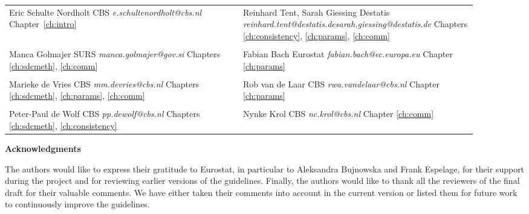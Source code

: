 \documentclass[openany,oneside]{book}
\begin{document}
\noindent
\begin{tabular}{p{0.45\linewidth}p{0.45\linewidth}}
Eric Schulte Nordholt\newline
CBS\newline
\textit{e.schultenordholt@cbs.nl}\newline
Chapter~\ref{ch:intro}
&
Reinhard Tent, Sarah Giessing\newline
Destatis\newline
\textit{reinhard.tent@destatis.de}\newline \textit{sarah.giessing@destatis.de}\newline
Chapters \ref{ch:consistency}, \ref{ch:params}, \ref{ch:comm}
\\
&\\
Manca Golmajer\newline
SURS\newline
\textit{manca.golmajer@gov.si}\newline
Chapters \ref{ch:sdcmeth}, \ref{ch:comm}
&
Fabian Bach\newline
Eurostat\newline
\textit{fabian.bach@ec.europa.eu}
\newline
Chapter \ref{ch:params}
\\
&\\
Marieke de Vries\newline
CBS\newline
\textit{mm.devries@cbs.nl}\newline
Chapters \ref{ch:sdcmeth}, \ref{ch:params}, \ref{ch:comm}
&
Rob van de Laar\newline
CBS\newline
\textit{rwa.vandelaar@cbs.nl}\newline
Chapter \ref{ch:params}
\\
&\\
Peter-Paul de Wolf\newline
CBS\newline
\textit{pp.dewolf@cbs.nl}\newline
Chapters \ref{ch:sdcmeth}, \ref{ch:consistency}
&
Nynke Krol\newline
CBS\newline
\textit{nc.krol@cbs.nl}\newline
Chapter \ref{ch:comm}
\end{tabular}\bigskip\bigskip

\noindent \textbf{\large Acknowledgments}\bigskip

\noindent 
The authors would like to express their gratitude to Eurostat, in particular to Aleksandra Bujnowska and Frank Espelage, for their support during the project and for reviewing earlier versions of the guidelines. 
Finally, the authors would like to thank all the reviewers of the final draft for their valuable comments. We have either taken their comments into account in the current version or listed them for future work to continuously improve the guidelines.
\vfill
\end{document}
